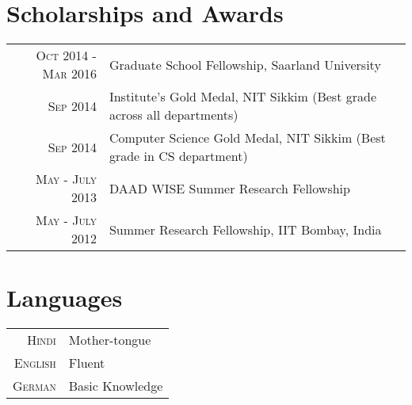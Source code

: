 \documentclass[a4paper,10pt]{article} %
\begin{document}
\section{Scholarships and Awards}
\vspace*{0.2cm}
\begin{tabular}{rp{14cm}}
\textsc{Oct 2014 - Mar 2016} & Graduate School Fellowship, Saarland University\\
\textsc{Sep 2014} & Institute's Gold Medal, NIT Sikkim (Best grade across all departments)\\
\textsc{Sep 2014} & Computer Science Gold Medal, NIT Sikkim (Best grade in CS department)\\
\textsc{May - July 2013} & DAAD WISE Summer Research Fellowship\\
\textsc{May - July 2012} & Summer Research Fellowship, IIT Bombay, India\\
\end{tabular}

\renewcommand{\bibpreamble}{\vskip0.5cm}
\renewcommand\refname{Publications}
\setlength\bibitemsep{\baselineskip}


\nocite{*}


\section{Languages}
\vspace*{0.2cm}
\begin{tabular}{rl}
\textsc{Hindi} & Mother-tongue\\
\textsc{English} & Fluent\\
\textsc{German} & Basic Knowledge\\
\end{tabular}

\end{document}
